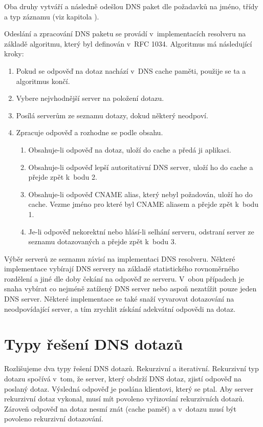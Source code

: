\documentclass[thesis=M,czech]{src/FITthesis}[2019/12/23]
\begin{document}
Oba druhy vytváří a následně odešlou DNS paket dle požadavků na jméno, třídy a typ záznamu (viz kapitola \textit{}). \cite{RFC1035, RFC8499}

Odeslání a zpracování DNS paketu se provádí v~implementacích resolveru na základě algoritmu, který byl definován v~RFC 1034. Algoritmus má následující kroky:

\begin{enumerate}
	\item Pokud  se odpověď na dotaz nachází v~DNS cache paměti, použije se ta a algoritmus končí.
	\item Vybere nejvhodnější server na položení dotazu. 
	\item Posílá serverům ze seznamu dotazy, dokud některý neodpoví. 
	\item Zpracuje odpověď a rozhodne se podle obsahu. 
	\begin{enumerate}[i]
		\item Obsahuje-li odpověď na dotaz, uloží do cache a předá ji aplikaci. 
		\item Obsahuje-li odpověď lepší autoritativní DNS server, uloží ho do cache a přejde zpět k~bodu 2. 
		\item Obsahuje-li odpověď CNAME alias, který nebyl požadován, uloží ho do cache. Vezme jméno pro které byl CNAME aliasem a přejde zpět k~bodu 1.
		\item Je-li odpověď nekorektní nebo hlásí-li selhání serveru, odstraní server ze seznamu dotazovaných a přejde zpět k~bodu 3. 
	\end{enumerate}
\end{enumerate}

Výběr serverů ze seznamu závisí na implementaci DNS resolveru. Některé implementace vybírají DNS servery na základě statistického rovnoměrného rozdělení a jiné dle doby čekání na odpověď ze serveru. V~obou případech je snaha vybírat co nejméně zatížený DNS server nebo aspoň nezatížit pouze jeden DNS server. Některé implementace se také snaží vyvarovat dotazování na neodpovídající server, a tím zrychlit získání adekvátní odpovědi na dotaz. \cite{dns-client-selection, RFC1034, RFC1035}



\section{Typy řešení DNS dotazů}
Rozlišujeme dva typy řešení DNS dotazů. Rekurzivní a iterativní. Rekurzivní typ dotazu spočívá v~tom, že server, který obdrží DNS dotaz, zjistí odpověď na poslaný dotaz. Výsledná odpověď je poslána klientovi, který se ptal. Aby server rekurzivní dotaz vykonal, musí mít povoleno vyřizování rekurzivních dotazů. Zároveň odpověď na dotaz nesmí znát (cache paměť) a v~dotazu musí být povoleno rekurzivní dotazování. 
\end{document}
